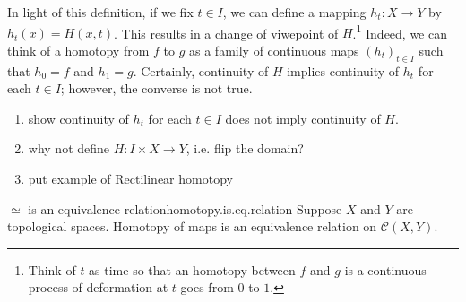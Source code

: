 
In light of this definition, if we fix \(t\in I\),  we can define a mapping \(h_t \colon X\to Y\) by \(h_t(x) = H(x,t)\). This results in a change of viwepoint of \(H\).\footnote{Think of \(t\) as time so that an homotopy between \(f\) and \(g\) is a continuous process of deformation at  \(t\) goes from \(0\) to \(1\).} Indeed, we can think of a homotopy from \(f\) to \(g\) as a family of continuous maps \(\left( h_t \right)_{t\in I}\) such that \(h_0 = f\) and \(h_1 = g\). Certainly,  continuity of \(H\) implies continuity of \(h_t\) for each \(t\in I\); however, the converse is not true.




    

\begin{example}
\begin{enumerate}[label=(\alph*)]
    \item show continuity of \(h_t\) for each \(t\in I\) does not imply continuity of \(H\). 
    \item why not define \(H:I\times X\to Y\), i.e. flip the domain?
    \item put example of Rectilinear homotopy
\end{enumerate}
\end{example}


\begin{theorem}{ \(\simeq\) is an equivalence relation}{homotopy.is.eq.relation}
    Suppose \(X\)  and \(Y\) are topological spaces. 
    Homotopy of maps is an equivalence relation on \(\mathcal{C}(X,Y)\).
\end{theorem}

